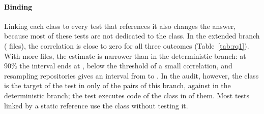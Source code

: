 \paragraph{Binding}
Linking each class to every test that references it also changes the answer, because most
of these tests are not dedicated to the class. In the extended branch (\FarquivosAmp{}
files), the correlation is close to zero for all three outcomes (Table~\ref{tab:rq1}).
With more files, the estimate is narrower than in the deterministic branch: at 90\% the
interval ends at \FmaiorEfeitoAmp{}, below the threshold of a small correlation, and
resampling repositories gives an interval from \FbootBaixoAmp{} to \FbootAltoAmp{}. In the
audit, however, the class is the target of the test in only \FprecisaoHumanaAmp{} of the
pairs of this branch, against \FprecisaoHumanaDet{} in the deterministic branch; the test
executes code of the class in \FprecisaoHumanaAmpAmplo{} of them. Most tests linked by a
static reference use the class without testing it.

